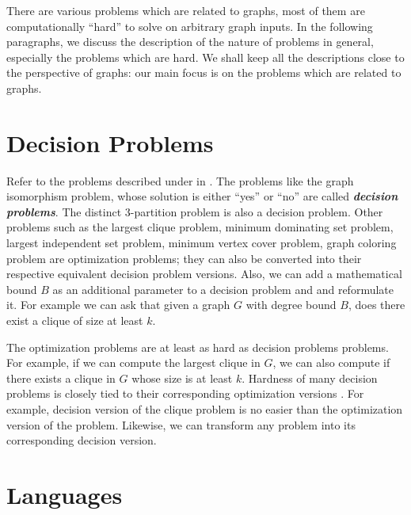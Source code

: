There are various problems which are related to graphs, most of them are computationally ``hard'' to solve on arbitrary graph inputs. In the following paragraphs, we discuss the description of the nature of problems in general, especially the problems which are hard. We shall keep all the descriptions close to the perspective of graphs: our main focus is on the problems which are related to graphs.

\section{Decision Problems}

Refer to the problems described under  in . The problems like the graph isomorphism problem, whose solution is either ``yes'' or ``no'' are called \textbf{\textit{decision problems}}. The distinct 3-partition problem is also a decision problem. Other problems such as the largest clique problem, minimum dominating set problem, largest independent set problem, minimum vertex cover problem, graph coloring problem are optimization problems; they can also be converted into their respective equivalent decision problem versions. Also, we can add a mathematical bound $B$ as an additional parameter to a decision problem and and reformulate it. For example we can ask that given a graph $G$ with degree bound $B$, does there exist a clique of size at least $k$.

The optimization problems are at least as hard as decision problems problems. For example, if we can compute the largest clique in $G$, we can also compute if there exists a clique in $G$ whose size is at least $k$. Hardness of many decision problems is closely tied to their corresponding optimization versions \cite{Garey1979}. For example, decision version of the clique problem is no easier than the optimization version of the problem. Likewise, we can transform any problem into its corresponding decision version.

\section{Languages}

